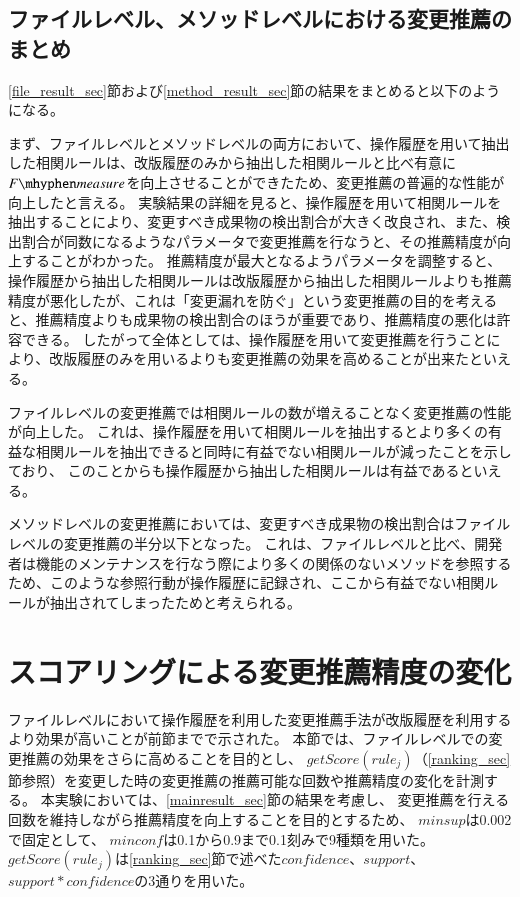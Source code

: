 \documentclass[a4paper]{jsbook}
\newcommand{\minconf}{mincon\!f}
\newcommand{\confidence}{con\!f\!idence}
\newcommand{\fmeasure}{F\mhyphen measure}
\newcommand{\getScore}{getS\!core}
\begin{document}
\subsection{ファイルレベル、メソッドレベルにおける変更推薦のまとめ}
\ref{file_result_sec}節および\ref{method_result_sec}節の結果をまとめると以下のようになる。

まず、ファイルレベルとメソッドレベルの両方において、操作履歴を用いて抽出した相関ルールは、改版履歴のみから抽出した相関ルールと比べ有意に$\fmeasure$を向上させることができたため、変更推薦の普遍的な性能が向上したと言える。
実験結果の詳細を見ると、操作履歴を用いて相関ルールを抽出することにより、変更すべき成果物の検出割合が大きく改良され、また、検出割合が同数になるようなパラメータで変更推薦を行なうと、その推薦精度が向上することがわかった。
推薦精度が最大となるようパラメータを調整すると、操作履歴から抽出した相関ルールは改版履歴から抽出した相関ルールよりも推薦精度が悪化したが、これは「変更漏れを防ぐ」という変更推薦の目的を考えると、推薦精度よりも成果物の検出割合のほうが重要であり、推薦精度の悪化は許容できる。
したがって全体としては、操作履歴を用いて変更推薦を行うことにより、改版履歴のみを用いるよりも変更推薦の効果を高めることが出来たといえる。

ファイルレベルの変更推薦では相関ルールの数が増えることなく変更推薦の性能が向上した。
これは、操作履歴を用いて相関ルールを抽出するとより多くの有益な相関ルールを抽出できると同時に有益でない相関ルールが減ったことを示しており、
このことからも操作履歴から抽出した相関ルールは有益であるといえる。

メソッドレベルの変更推薦においては、変更すべき成果物の検出割合はファイルレベルの変更推薦の半分以下となった。
これは、ファイルレベルと比べ、開発者は機能のメンテナンスを行なう際により多くの関係のないメソッドを参照するため、このような参照行動が操作履歴に記録され、ここから有益でない相関ルールが抽出されてしまったためと考えられる。

\section{スコアリングによる変更推薦精度の変化}\label{varyscoring_sec}
ファイルレベルにおいて操作履歴を利用した変更推薦手法が改版履歴を利用するより効果が高いことが前節までで示された。
本節では、ファイルレベルでの変更推薦の効果をさらに高めることを目的とし、
$\getScore(rule_j)$（\ref{ranking_sec}節参照）を変更した時の変更推薦の推薦可能な回数や推薦精度の変化を計測する。
本実験においては、\ref{mainresult_sec}節の結果を考慮し、
変更推薦を行える回数を維持しながら推薦精度を向上することを目的とするため、
$minsup$は0.002で固定として、
$\minconf$は0.1から0.9まで0.1刻みで9種類を用いた。
$\getScore(rule_j)$は\ref{ranking_sec}節で述べた$\confidence$、$support$、$support*\confidence$の3通りを用いた。
\end{document}
